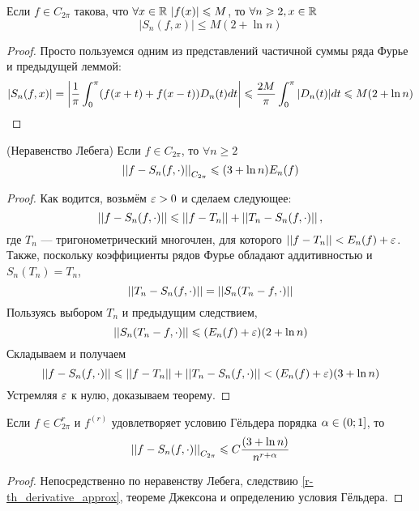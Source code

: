 \begin{corollary}
	Если $f \in C_{2\pi}$ такова, что $\forall x \in \mathbb{R} \ |f(x)| \leqslant M$, то $\forall n \geqslant 2, x \in \mathbb{R}$
	\[
		|S_n(f, x)| \leq M(2 + \ln n)
	\]
\end{corollary}

\begin{proof}
	Просто пользуемся одним из представлений частичной суммы ряда Фурье и предыдущей леммой:
	\[
		|S_n(f, x)| = \left|\frac{1}{\pi} \int_0^\pi (f(x+t) + f(x-t))D_n(t) dt\right| \leqslant \frac{2M}{\pi} \int_0^\pi |D_n(t)| dt \leqslant M(2 + \ln n)
	\]
\end{proof}

\begin{theorem} (Неравенство Лебега)
	Если $f \in C_{2\pi}$, то $\forall n \geq 2$
	\[
		\left|\left|f - S_n(f, \cdot)\right|\right|_{C_{2\pi}} \leqslant (3 + \ln n)E_n(f)
	\]
\end{theorem}

\begin{proof}
	Как водится, возьмём $\varepsilon > 0$ и сделаем следующее:
	\[
		\left|\left|f - S_n(f, \cdot)\right|\right| \leqslant \left|\left|f - T_n\right|\right| + \left|\left|T_n - S_n(f, \cdot)\right|\right|,
	\]
	где $T_n$ --- тригонометрический многочлен, для которого $\left|\left|f - T_n\right|\right| < E_n(f) + \varepsilon$. Также, поскольку коэффициенты рядов Фурье обладают аддитивностью и $S_n(T_n) = T_n$,
	\[
		\left|\left|T_n - S_n(f, \cdot)\right|\right| = \left|\left|S_n(T_n - f, \cdot)\right|\right|
	\]
	Пользуясь выбором $T_n$ и предыдущим следствием,
	\[
		\left|\left|S_n(T_n - f, \cdot)\right|\right| \leqslant (E_n(f) + \varepsilon)(2 + \ln n)
	\]
	Складываем и получаем
	\[
		\left|\left|f - S_n(f, \cdot)\right|\right| \leqslant \left|\left|f - T_n\right|\right| + \left|\left|T_n - S_n(f, \cdot)\right|\right| < (E_n(f) + \varepsilon)(3 + \ln n)
	\]
	Устремляя $\varepsilon$ к нулю, доказываем теорему.
\end{proof}

\begin{corollary}
	Если $f \in C_{2\pi}^r$ и $f^{(r)}$ удовлетворяет условию Гёльдера порядка $\alpha \in \left(0; 1\right]$, то
	\[
		\left|\left|f - S_n(f, \cdot)\right|\right|_{C_{2\pi}} \leqslant C\frac{(3 + \ln n)}{n^{r + \alpha}}
	\]
\end{corollary}

\begin{proof}
	Непосредственно по неравенству Лебега, следствию \ref{r-th_derivative_approx}, теореме Джексона и определению условия Гёльдера.
\end{proof}